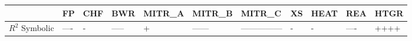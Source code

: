 \begin{tabular}{lllllllllll}
\toprule
 & FP & CHF & BWR & MITR_A & MITR_B & MITR_C & XS & HEAT & REA & HTGR \\
\midrule
$R^2$ Symbolic & ---- & - & ----- & + & ------ & --------------- & - & - & ---- & ++++ \\
\bottomrule
\end{tabular}
